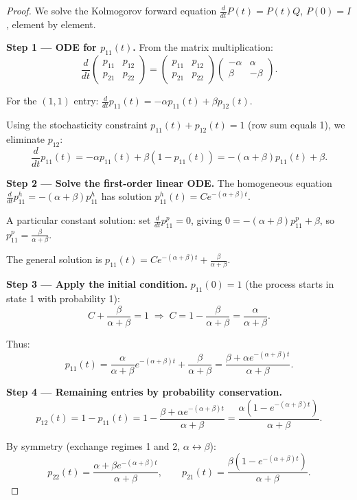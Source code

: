 \documentclass[11pt,a4paper,openany]{book}
\theoremstyle{definition}
\theoremstyle{plain}
\theoremstyle{remark}
\newcommand{\1}{\mathbbm{1}}
\begin{document}
\begin{proof}
We solve the Kolmogorov forward equation $\frac{d}{dt}P(t) = P(t)Q$, $P(0) = I$, element by element.

\textbf{Step 1 --- ODE for $p_{11}(t)$.} From the matrix multiplication:
\[
\frac{d}{dt} \begin{pmatrix} p_{11} & p_{12} \\ p_{21} & p_{22} \end{pmatrix} = \begin{pmatrix} p_{11} & p_{12} \\ p_{21} & p_{22} \end{pmatrix} \begin{pmatrix} -\alpha & \alpha \\ \beta & -\beta \end{pmatrix}.
\]

For the $(1,1)$ entry: $\frac{d}{dt} p_{11}(t) = -\alpha p_{11}(t) + \beta p_{12}(t)$.

Using the stochasticity constraint $p_{11}(t) + p_{12}(t) = 1$ (row sum equals 1), we eliminate $p_{12}$:
\[
\frac{d}{dt} p_{11}(t) = -\alpha p_{11}(t) + \beta(1 - p_{11}(t)) = -(\alpha+\beta) p_{11}(t) + \beta.
\]

\textbf{Step 2 --- Solve the first-order linear ODE.} The homogeneous equation $\frac{d}{dt}p_{11}^{h} = -(\alpha+\beta) p_{11}^{h}$ has solution $p_{11}^{h}(t) = C e^{-(\alpha+\beta)t}$.

A particular constant solution: set $\frac{d}{dt}p_{11}^{p} = 0$, giving $0 = -(\alpha+\beta)p_{11}^{p} + \beta$, so $p_{11}^{p} = \frac{\beta}{\alpha+\beta}$.

The general solution is $p_{11}(t) = C e^{-(\alpha+\beta)t} + \frac{\beta}{\alpha+\beta}$.

\textbf{Step 3 --- Apply the initial condition.} $p_{11}(0) = 1$ (the process starts in state 1 with probability 1):
\[
C + \frac{\beta}{\alpha+\beta} = 1 \;\Longrightarrow\; C = 1 - \frac{\beta}{\alpha+\beta} = \frac{\alpha}{\alpha+\beta}.
\]

Thus:
\[
p_{11}(t) = \frac{\alpha}{\alpha+\beta} e^{-(\alpha+\beta)t} + \frac{\beta}{\alpha+\beta} = \frac{\beta + \alpha e^{-(\alpha+\beta)t}}{\alpha+\beta}.
\]

\textbf{Step 4 --- Remaining entries by probability conservation.}
\[
p_{12}(t) = 1 - p_{11}(t) = 1 - \frac{\beta + \alpha e^{-(\alpha+\beta)t}}{\alpha+\beta} = \frac{\alpha(1 - e^{-(\alpha+\beta)t})}{\alpha+\beta}.
\]

By symmetry (exchange regimes 1 and 2, $\alpha \leftrightarrow \beta$):
\[
p_{22}(t) = \frac{\alpha + \beta e^{-(\alpha+\beta)t}}{\alpha+\beta}, \qquad
p_{21}(t) = \frac{\beta(1 - e^{-(\alpha+\beta)t})}{\alpha+\beta}.
\]


\end{proof}
\end{document}
